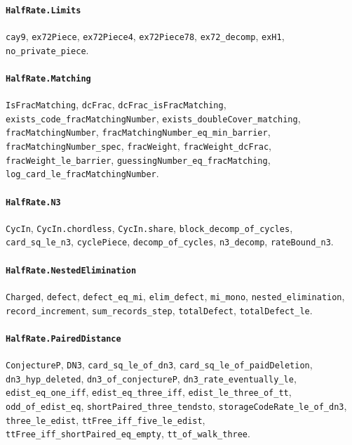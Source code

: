 \paragraph{\texttt{HalfRate.Limits}}
{\small\raggedright \texttt{cay9}, \texttt{ex72Piece}, \texttt{ex72Piece4}, \texttt{ex72Piece78}, \texttt{ex72\_decomp}, \texttt{exH1}, \texttt{no\_private\_piece}.\par}

\paragraph{\texttt{HalfRate.Matching}}
{\small\raggedright \texttt{IsFracMatching}, \texttt{dcFrac}, \texttt{dcFrac\_isFracMatching}, \texttt{exists\_code\_fracMatchingNumber}, \texttt{exists\_doubleCover\_matching}, \texttt{fracMatchingNumber}, \texttt{fracMatchingNumber\_eq\_min\_barrier}, \texttt{fracMatchingNumber\_spec}, \texttt{fracWeight}, \texttt{fracWeight\_dcFrac}, \texttt{fracWeight\_le\_barrier}, \texttt{guessingNumber\_eq\_fracMatching}, \texttt{log\_card\_le\_fracMatchingNumber}.\par}

\paragraph{\texttt{HalfRate.N3}}
{\small\raggedright \texttt{CycIn}, \texttt{CycIn.chordless}, \texttt{CycIn.share}, \texttt{block\_decomp\_of\_cycles}, \texttt{card\_sq\_le\_n3}, \texttt{cyclePiece}, \texttt{decomp\_of\_cycles}, \texttt{n3\_decomp}, \texttt{rateBound\_n3}.\par}

\paragraph{\texttt{HalfRate.NestedElimination}}
{\small\raggedright \texttt{Charged}, \texttt{defect}, \texttt{defect\_eq\_mi}, \texttt{elim\_defect}, \texttt{mi\_mono}, \texttt{nested\_elimination}, \texttt{record\_increment}, \texttt{sum\_records\_step}, \texttt{totalDefect}, \texttt{totalDefect\_le}.\par}

\paragraph{\texttt{HalfRate.PairedDistance}}
{\small\raggedright \texttt{ConjectureP}, \texttt{DN3}, \texttt{card\_sq\_le\_of\_dn3}, \texttt{card\_sq\_le\_of\_paidDeletion}, \texttt{dn3\_hyp\_deleted}, \texttt{dn3\_of\_conjectureP}, \texttt{dn3\_rate\_eventually\_le}, \texttt{edist\_eq\_one\_iff}, \texttt{edist\_eq\_three\_iff}, \texttt{edist\_le\_three\_of\_tt}, \texttt{odd\_of\_edist\_eq}, \texttt{shortPaired\_three\_tendsto}, \texttt{storageCodeRate\_le\_of\_dn3}, \texttt{three\_le\_edist}, \texttt{ttFree\_iff\_five\_le\_edist}, \texttt{ttFree\_iff\_shortPaired\_eq\_empty}, \texttt{tt\_of\_walk\_three}.\par}

